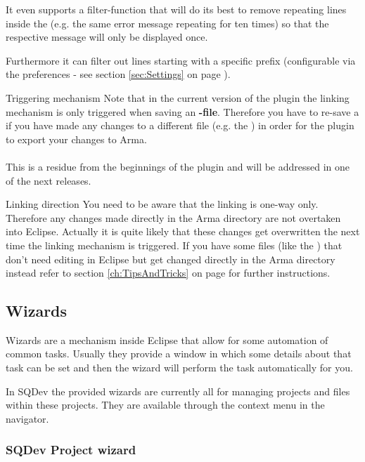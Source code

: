 \documentclass[twoside=false]{scrbook}
\newcommand{\SQDev}{SQDev\xspace}
\newcommand{\eclipse}{Eclipse\xspace}
\newcommand{\arma}{Arma\xspace}
\begin{document}
	It even supports a filter-function that will do its best to remove repeating lines inside the  (e.g. the same error message repeating for ten times) so that the respective message will only be displayed once.
	
	Furthermore it can filter out lines starting with a specific prefix (configurable via the preferences - see section \ref{sec:Settings} on page \pageref{sec:Settings}).
	
	
	\begin{warning}{Triggering mechanism}
		Note that in the current version of the plugin the linking mechanism is only triggered when saving an \textbf{-file}. Therefore you have to re-save a  if you have made any changes to a different file (e.g. the ) in order for the plugin to export your changes to \arma.\\
		\\
		This is a residue from the beginnings of the plugin and will be addressed in one of the next releases.
	\end{warning}
	\begin{warning}{Linking direction}
		You need to be aware that the linking is one-way only. Therefore any changes made directly in the \arma directory are not overtaken into \eclipse. Actually it is quite likely that these changes get overwritten the next time the linking mechanism is triggered. If you have some files (like the ) that don't need editing in \eclipse but get changed directly in the \arma directory instead refer to section \ref{ch:TipsAndTricks} on page \pageref{ch:TipsAndTricks} for further instructions.
	\end{warning}
	
	
	\subsection{Wizards}
	\label{ssec:Wizards}
	Wizards are a mechanism inside \eclipse that allow for some automation of common tasks. Usually they provide a window in which some details about that task can be set and then the wizard will perform the task automatically for you.
	
	In \SQDev the provided wizards are currently all for managing projects and files within these projects. They are available through the context menu in the navigator.
	
	\subsubsection{\SQDev Project wizard}
\end{document}
